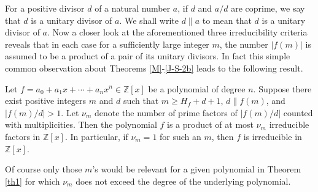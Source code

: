 \documentclass[12pt,reqno]{amsart}%
\begin{document}
For a positive divisor $d$ of a natural number $a$, if $d$ and $a/d$ are coprime, we say that $d$ is a unitary divisor of $a$. We shall write $d\| a$ to mean that $d$ is a unitary divisor of $a$. Now a closer look at the aforementioned three  irreducibility criteria reveals that in each case for a sufficiently large integer $m$, the number $|f(m)|$ is assumed to be a product of a pair of its unitary divisors. In fact this simple common observation about Theorems \ref{M}-\ref{J-S-2b} leads to the following result.
\begin{theorem}\label{th1}
Let $f=a_0+a_1x+\cdots +a_nx^n\in \mathbb Z[x]$ be a polynomial of degree $n$. Suppose there exist positive integers $m$ and $d$ such that $m\geq H_f+d+1$, $d\|f(m)$, and $|f(m)/d|>1$. Let $\nu_m$ denote the number of prime factors of $|f(m)/d|$ counted with multiplicities. Then the polynomial $f$ is a product of at most $\nu_m$ irreducible factors in $\mathbb Z[x]$. In particular, if $\nu_m=1$ for such an $m$, then $f$ is irreducible in $\mathbb Z[x]$.
\end{theorem}
Of course only those $m$'s would be relevant for a given polynomial in Theorem \ref{th1} for which $\nu_m$ does not exceed the degree of the underlying polynomial.
\end{document}
